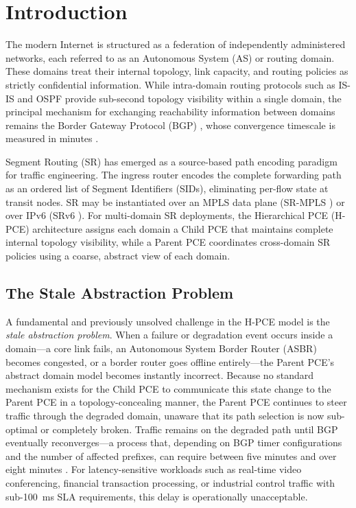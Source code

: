 \documentclass[conference]{IEEEtran}
\begin{document}
\section{Introduction}
\label{sec:intro}

The modern Internet is structured as a federation of independently
administered networks, each referred to as an Autonomous System (AS) or
routing domain. These domains treat their internal topology, link
capacity, and routing policies as strictly confidential information.
While intra-domain routing protocols such as IS-IS \cite{b_isis} and
OSPF \cite{b_ospf} provide sub-second topology visibility within a
single domain, the principal mechanism for exchanging reachability
information between domains remains the Border Gateway Protocol (BGP)
\cite{b_rfc4271}, whose convergence timescale is measured in minutes
\cite{b_bgpconv}.

Segment Routing (SR) \cite{b_srarch} has emerged as a source-based path
encoding paradigm for traffic engineering. The ingress router encodes
the complete forwarding path as an ordered list of Segment Identifiers
(SIDs), eliminating per-flow state at transit nodes. SR may be
instantiated over an MPLS data plane (SR-MPLS \cite{b_srmpls}) or over
IPv6 (SRv6 \cite{b_srv6}). For multi-domain SR deployments, the
Hierarchical PCE (H-PCE) architecture \cite{b_rfc8685} assigns each
domain a Child PCE that maintains complete internal topology visibility,
while a Parent PCE coordinates cross-domain SR policies using a coarse,
abstract view of each domain.

\subsection*{The Stale Abstraction Problem}

A fundamental and previously unsolved challenge in the H-PCE model is
the \emph{stale abstraction problem}. When a failure or degradation
event occurs inside a domain---a core link fails, an Autonomous System
Border Router (ASBR) becomes congested, or a border router goes offline
entirely---the Parent PCE's abstract domain model becomes instantly
incorrect. Because no standard mechanism exists for the Child PCE to
communicate this state change to the Parent PCE in a
topology-concealing manner, the Parent PCE continues to steer traffic
through the degraded domain, unaware that its path selection is now
sub-optimal or completely broken. Traffic remains on the degraded path
until BGP eventually reconverges---a process that, depending on BGP
timer configurations and the number of affected prefixes, can require
between five minutes and over eight minutes \cite{b_bgpconv, b_bgpconv2}. For
latency-sensitive workloads such as real-time video conferencing,
financial transaction processing, or industrial control traffic with
sub-100~ms SLA requirements, this delay is operationally unacceptable.
\end{document}
